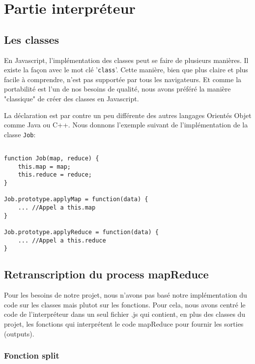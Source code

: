 \newpage
\section{Partie interpréteur}



\subsection{Les classes}

En Javascript, l'implémentation des classes peut se faire de plusieurs manières. Il existe la façon avec le mot clé '{\tt class}'. Cette manière, bien que plus claire et plus facile à comprendre, n'est pas supportée par tous les navigateurs. Et comme la portabilité est l'un de nos besoins de qualité, nous avons préféré la manière "classique" de créer des classes en Javascript.

La déclaration est par contre un peu différente des autres langages Orientés Objet comme Java ou C++. Nous donnons l'exemple suivant de l'implémentation de la classe {\tt Job}:\\

\begin{lstlisting}

function Job(map, reduce) { 
    this.map = map;
    this.reduce = reduce;
}

Job.prototype.applyMap = function(data) {
	... //Appel a this.map 
}

Job.prototype.applyReduce = function(data) {
    ... //Appel a this.reduce
}

\end{lstlisting}


\subsection{Retranscription du process mapReduce}


Pour les besoins de notre projet, nous n'avons pas basé notre implémentation du code sur les classes mais plutot sur les fonctions. Pour cela, nous avons centré le code de l'interpréteur dans un seul fichier .js qui contient, en plus des classes du projet, les fonctions qui interprétent le code mapReduce pour fournir les sorties (outputs).

\subsubsection{Fonction split}

